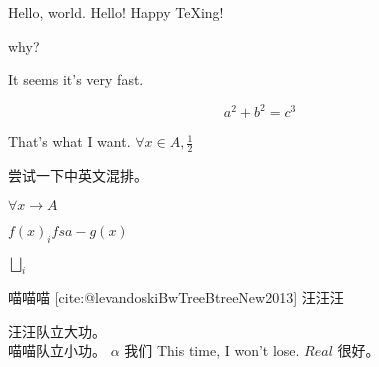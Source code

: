 Hello, world.
Hello!
Happy \TeX ing!

why?

It seems it's very fast.

\begin{equation}
    a^2+b^2=c^3
\end{equation}

That's what I want.
\(\forall x \in A, \frac{1}{2}\)

尝试一下中英文混排。

\(\forall x \to A\)

\(f(x)_{i}  fsa- g(x)\)

\(\bigsqcup_{i}\)

喵喵喵
[cite:@levandoskiBwTreeBtreeNew2013]
汪汪汪

汪汪队立大功。\\
喵喵队立小功。
\(\alpha\)
我们
This time, I won't lose.
\( Real\)
很好。
